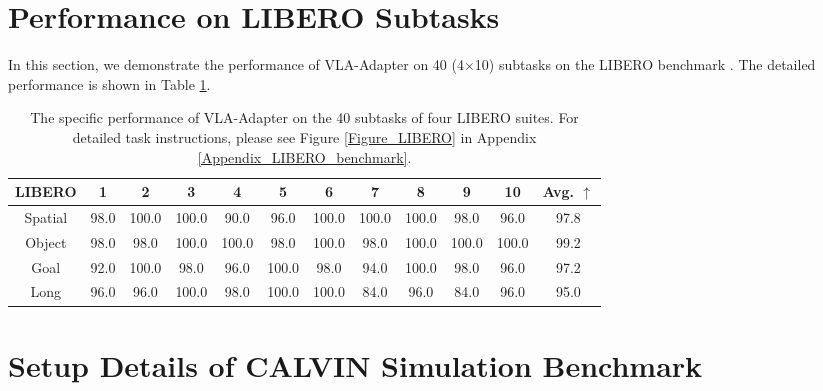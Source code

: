 \vspace{3ex}

\section{Performance on LIBERO Subtasks}\label{AppendixD}
\renewcommand{\thefigure}{D\arabic{figure}}
\renewcommand{\theHfigure}{D\arabic{figure}}
\setcounter{figure}{0}

\renewcommand{\thetable}{D\arabic{table}}
\renewcommand{\theHtable}{D\arabic{table}}
\setcounter{table}{0}

In this section, we demonstrate the performance of VLA-Adapter on 40 (4$\times$10) subtasks on the LIBERO benchmark \citep{LIBERO-2023}. The detailed performance is shown in Table \ref{TableD1}.

\begin{table}[!htbp]
	\centering
	\small
	\caption{The specific performance of VLA-Adapter on the 40 subtasks of four LIBERO \citep{LIBERO-2023} suites. For detailed task instructions, please see Figure \ref{Figure_LIBERO} in Appendix \ref{Appendix_LIBERO_benchmark}.}\label{TableD1}%
	\begin{tabular}{c|cccccccccc|c}
		\toprule[1pt]
		LIBERO & 1     & 2     & 3     & 4     & 5     & 6     & 7     & 8     & 9     & 10    & \textbf{Avg. $\uparrow$} \\
		\midrule[0.5pt]
		Spatial &  98.0     &   100.0    &   100.0    & 90.0      &   96.0    &  100.0     &   100.0    &    100.0   &    98.0   &    96.0   & 97.8 \\
        
		Object & 98.0  & 98.0  & 100.0  & 100.0  & 98.0  & 100.0 & 98.0  & 100.0 & 100.0  & 100.0 & 99.2 \\
        
		Goal  &   92.0    &    100.0   &   98.0    &    96.0   &     100.0  &    98.0   &   94.0    &   100.0    &  98.0     &   96.0    & 97.2 \\
        
		Long  & 96.0&96.0& 100.0 &98.0&100.0&100.0& 84.0& 96.0& 84.0& 96.0&95.0 \\
		\bottomrule[1pt]
	\end{tabular}%
\end{table}%

\vspace{5ex}

\section{Setup Details of CALVIN Simulation Benchmark}\label{AppendixCALVIN}
\renewcommand{\thefigure}{E\arabic{figure}}
\renewcommand{\theHfigure}{E\arabic{figure}}
\setcounter{figure}{0}

